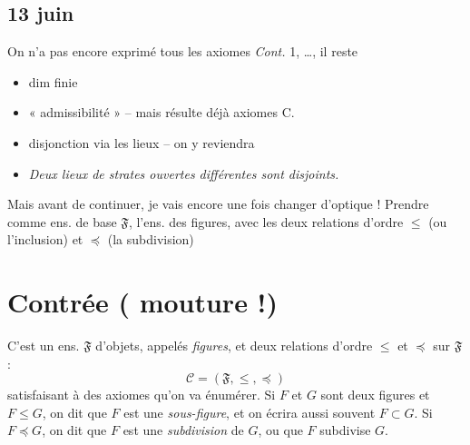 \documentclass[11pt,a4paper]{article}
\begin{document}


\subsection{13 juin}

On n'a pas encore exprimé tous les axiomes \emph{Cont.} 1, \ldots, il reste 
\begin{itemize}
  \item[\emph{Cont 3}] dim finie
  \item[\emph{Cont 4}] « admissibilité » -- mais résulte déjà \ill{}  axiomes C.
  \item[\emph{Cont 6}]  disjonction via les lieux -- on y reviendra
  \item[\emph{Cont 7}] \emph{Deux lieux de strates ouvertes différentes sont disjoints.}
\end{itemize}

Mais avant de continuer, je vais encore une fois changer d'optique ! Prendre comme ens. de base $\mathfrak{F}$, l'ens. des figures, avec les deux relations d'ordre $\leq$ (ou l'inclusion) et $\preccurlyeq$ (la subdivision)

\section{Contrée ( mouture !)}


C'est un ens. $\mathfrak{F}$ d'objets, appelés \emph{figures}, et deux relations d'ordre $\leq$ et $\preccurlyeq$ sur $\mathfrak{F}$ :
\[
  \mathcal{C} = (\mathfrak{F}, \leq, \preccurlyeq)
\]
satisfaisant à des axiomes qu'on va énumérer. Si $F$ et $G$ sont deux figures et $F \leq G$, on dit que $F$ est une \emph{sous-figure}, et on écrira aussi souvent $F \subset G$. Si $F \preccurlyeq G$, on dit que $F$ est une \emph{subdivision} de $G$, ou que $F$ subdivise $G$.
\end{document}
